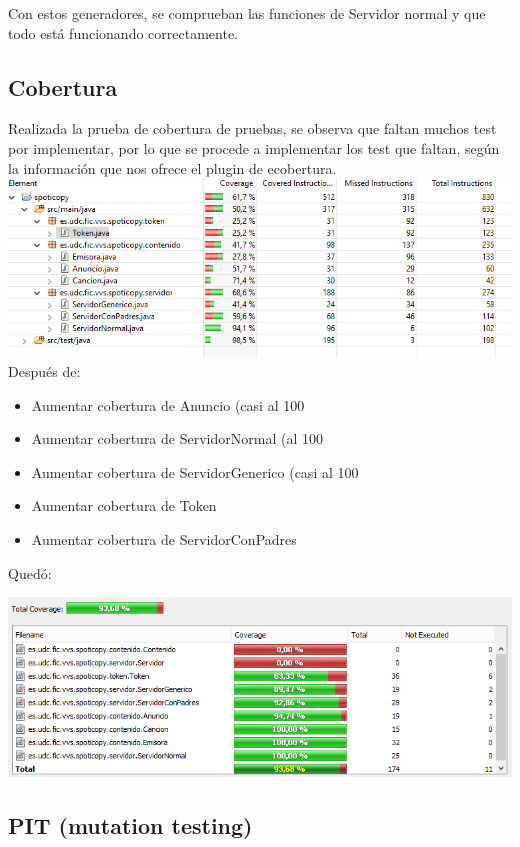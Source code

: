 \documentclass[12pt, a4paper, titlepage]{article}
\begin{document}
Con estos generadores, se comprueban las funciones de Servidor normal y que todo está funcionando correctamente.

\subsection{Cobertura}
Realizada la prueba de cobertura de pruebas, se observa que faltan muchos test por implementar, por lo que se procede a implementar los test que faltan, según la información que nos ofrece el plugin de ecobertura.\\
\includegraphics[width=15cm]{Imagenes/CoberturaSemana1.png} \\

Después de:
\begin{itemize}
	\item Aumentar cobertura de Anuncio (casi al 100%
	\item Aumentar cobertura de ServidorNormal (al 100%
	\item Aumentar cobertura de ServidorGenerico (casi al 100%
	\item Aumentar cobertura de Token 
	\item Aumentar cobertura de ServidorConPadres
\end{itemize}

Quedó:

\includegraphics[width=15cm]{Imagenes/CoberturaSemana2.png} \\

\subsection{PIT (mutation testing)}
\end{document}
